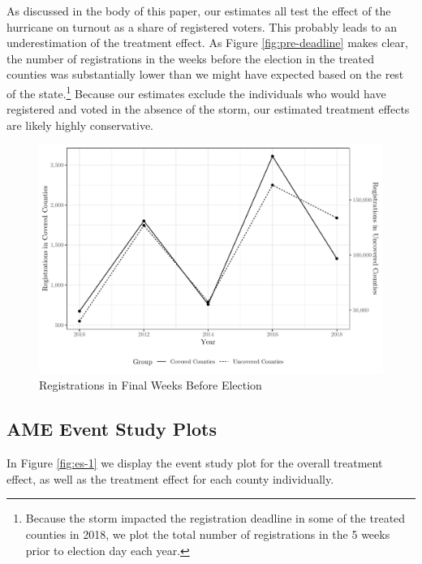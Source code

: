 \documentclass[
  12pt,
]{article}
\begin{document}
As discussed in the body of this paper, our estimates all test the effect of the hurricane on turnout as a share of registered voters. This probably leads to an underestimation of the treatment effect. As Figure \ref{fig:pre-deadline} makes clear, the number of registrations in the weeks before the election in the treated counties was substantially lower than we might have expected based on the rest of the state.\footnote{Because the storm impacted the registration deadline in some of the treated counties in 2018, we plot the total number of registrations in the 5 weeks prior to election day each year.} Because our estimates exclude the individuals who would have registered and voted in the absence of the storm, our estimated treatment effects are likely highly conservative.

\begin{figure}[H]

{\centering \includegraphics{si_files/figure-latex/regs-chunk-1} 

}

\caption{\label{fig:pre-deadline}Registrations in Final Weeks Before Election}\label{fig:regs-chunk}
\end{figure}

\hypertarget{ame-event-study-plots}{%
\subsection*{AME Event Study Plots}\label{ame-event-study-plots}}

In Figure \ref{fig:es-1} we display the event study plot for the overall treatment effect, as well as the treatment effect for each county individually.
\end{document}
